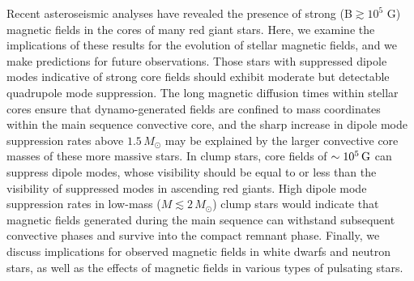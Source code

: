 Recent asteroseismic analyses have revealed the presence of strong (B$\gtrsim 10^5$ G) magnetic fields in the cores of many red giant stars. 
Here, we examine the implications of these results for the  evolution of stellar  magnetic fields, and we make predictions for future observations. Those stars with suppressed dipole modes indicative of strong core fields should exhibit moderate but detectable quadrupole mode suppression.
The long magnetic diffusion times within stellar cores ensure that dynamo-generated fields are confined to mass coordinates within the main sequence convective core, and the sharp increase in dipole mode suppression rates above $1.5 \, M_\odot$ may be explained by the larger convective core masses of these more massive stars.
In clump stars, core fields of $\sim 10^5 \, {\rm G}$ can suppress dipole modes, whose visibility should be equal to or less than the visibility of suppressed modes in ascending red giants. High dipole mode suppression rates in low-mass ($M \lesssim 2 \, M_\odot$) clump stars would indicate that magnetic fields generated during the main sequence can withstand subsequent convective phases and survive into the compact remnant phase. Finally, we discuss implications for observed magnetic fields in white dwarfs and neutron stars, as well as the effects of magnetic fields in various types of pulsating stars.
  
  
  
  
  
  
  